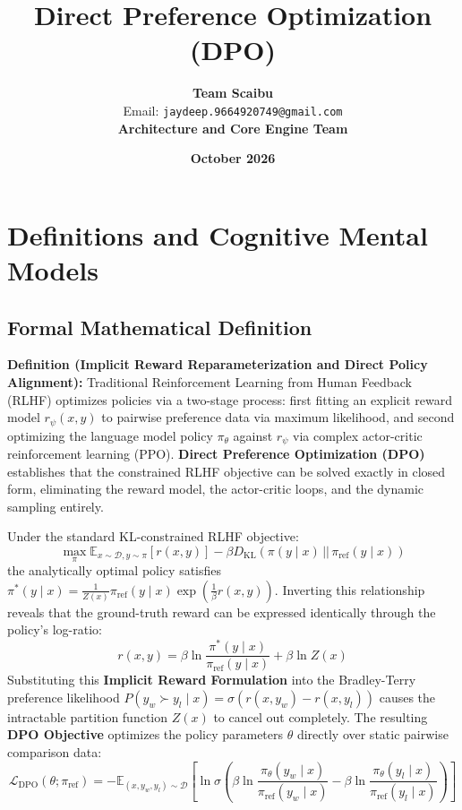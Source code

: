 \documentclass[11pt,a4paper]{article}
\title{\textbf{Direct Preference Optimization (DPO)}}
\author{\textbf{Team Scaibu} \\ \small Email: \texttt{jaydeep.9664920749@gmail.com} \\ \small \textbf{Architecture and Core Engine Team}}
\date{\textbf{October 2026}}
\theoremstyle{definition}
\begin{document}
\maketitle

\section{Definitions and Cognitive Mental Models}

\subsection{Formal Mathematical Definition}
\textbf{Definition (Implicit Reward Reparameterization and Direct Policy Alignment):}
Traditional Reinforcement Learning from Human Feedback (RLHF) optimizes policies via a two-stage process: first fitting an explicit reward model $r_\psi(x, y)$ to pairwise preference data via maximum likelihood, and second optimizing the language model policy $\pi_\theta$ against $r_\psi$ via complex actor-critic reinforcement learning (PPO). \textbf{Direct Preference Optimization (DPO)} establishes that the constrained RLHF objective can be solved exactly in closed form, eliminating the reward model, the actor-critic loops, and the dynamic sampling entirely.

Under the standard KL-constrained RLHF objective:
{\boldmath
\begin{equation}
\max_\pi \mathbb{E}_{x \sim \mathcal{D}, y \sim \pi}[r(x, y)] - \beta D_{\text{KL}}(\pi(y \mid x) \,||\, \pi_{\text{ref}}(y \mid x))
\end{equation}
}
the analytically optimal policy satisfies $\pi^*(y \mid x) = \frac{1}{Z(x)} \pi_{\text{ref}}(y \mid x) \exp\left(\frac{1}{\beta} r(x, y)\right)$. Inverting this relationship reveals that the ground-truth reward can be expressed identically through the policy's log-ratio:
{\boldmath
\begin{equation}
r(x, y) = \beta \ln \frac{\pi^*(y \mid x)}{\pi_{\text{ref}}(y \mid x)} + \beta \ln Z(x)
\end{equation}
}
Substituting this \textbf{Implicit Reward Formulation} into the Bradley-Terry preference likelihood $P(y_w \succ y_l \mid x) = \sigma(r(x, y_w) - r(x, y_l))$ causes the intractable partition function $Z(x)$ to cancel out completely. The resulting \textbf{DPO Objective} optimizes the policy parameters $\theta$ directly over static pairwise comparison data:
{\boldmath
\begin{equation}
\mathcal{L}_{\text{DPO}}(\theta; \pi_{\text{ref}}) = - \mathbb{E}_{(x, y_w, y_l) \sim \mathcal{D}} \left[ \ln \sigma\left( \beta \ln \frac{\pi_\theta(y_w \mid x)}{\pi_{\text{ref}}(y_w \mid x)} - \beta \ln \frac{\pi_\theta(y_l \mid x)}{\pi_{\text{ref}}(y_l \mid x)} \right) \right]
\end{equation}
}
\end{document}
